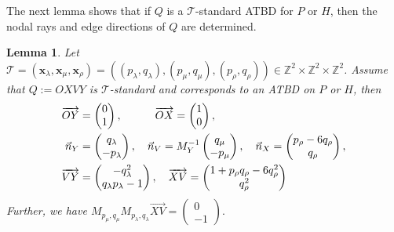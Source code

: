 \documentclass[11pt, reqno]{amsart}
\newtheorem{lemma}[thm]{Lemma}
\theoremstyle{remark}
\numberwithin{equation}{subsection}
\numberwithin{figure}{section}
\theoremstyle{customremark}
\newcommand{\Tt}{\mathcal{T}}
\newcommand{\vn}{{\vec{n}}}
\newcommand{\ovr}{\overrightarrow}
\newcommand{\la}{{\lambda}}
\newcommand{\Z}{\mathbb{Z}}
\begin{document}
The next lemma shows that if $Q$ is a $\Tt$-standard ATBD for $P$ or $H$, then the nodal rays and edge directions of $Q$ are determined. 
\begin{lemma} \label{lem:standFrom}
      Let $\Tt=(\bm{x}_\la,\bm{x}_\mu,\bm{x}_\rho)=((p_\la,q_\la),(p_\mu,q_\mu),(p_\rho,q_\rho)) \in \Z^2 \times \Z^2 \times \Z^2$. Assume that $Q:=OXVY$ is $\Tt$-standard and corresponds to an ATBD on $P$ or $H$, then 
    \begin{align*}
    \notag
\ovr{OY}&=\begin{pmatrix}
0 \\ 1
\end{pmatrix}, \quad \quad \quad
\ovr{OX}=\begin{pmatrix}
1 \\ 0
\end{pmatrix},\\
    \vn_Y&=\begin{pmatrix}
q_\la \\ -p_\la
\end{pmatrix}, \quad \vn_{V}=M_Y^{-1}\begin{pmatrix} q_\mu \\ -p_\mu \end{pmatrix},
\quad \vn_X=\begin{pmatrix}
p_\rho-6q_\rho \\ q_\rho
\end{pmatrix}, \\ 
\ovr{VY}&=\begin{pmatrix}
-q_\la^2 \\ q_\la p_\la-1
\end{pmatrix}, \quad
\ovr{XV}=\begin{pmatrix}
1+p_\rho q_\rho-6q_\rho^2 \\ q_\rho^2
\end{pmatrix}
\end{align*}
Further, we have $M_{p_\mu,q_\mu}M_{p_\la,q_\la}\ovr{XV}=\begin{pmatrix}
    0 \\ -1
\end{pmatrix}.$
\end{lemma}
\end{document}
